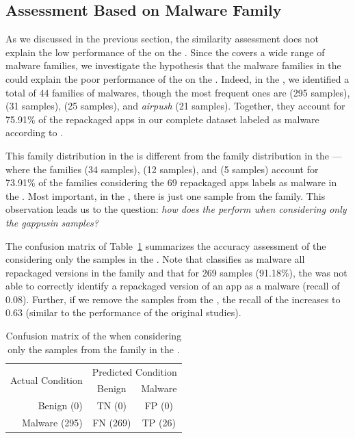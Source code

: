 \subsection{Assessment Based on Malware Family}


As we discussed in the previous
section, the similarity assessment does not explain the low performance of the
\mas on the \cds. Since the \cds covers a wide range of malware families, we investigate the
hypothesis that the malware families in the \cds could
explain the poor performance of the \mas on the \cds.
Indeed, in the \cds, we identified a total of
44 families of malwares, though the most frequent
ones are \gps (295 samples),  (31 samples),  (25 samples), and \emph{airpush} (21 samples). Together, they
account for 75.91\% of the repackaged apps in our
complete dataset labeled as malware according to \vt.

This family distribution in the \cds is
different from the family
distribution in the \sds---where the
families  (34 samples),  (12 samples),
and  (5 samples) account for
73.91\% of the families considering the 69
repackaged apps \vt labels as malware in the \sds.
Most important, in the \sds, there is just one
sample from the \gps family. This observation
leads us to the question: \emph{how does the \mas
perform when considering only the gappusin samples?}



The confusion matrix of Table~\ref{tab:gappusin} summarizes the accuracy assessment of the \mas considering
only the \gps samples in the \cds. Note that \vt classifies as malware all repackaged versions in the \gps
family and that for 269 samples (91.18\%), the \mas was not able to correctly identify
a repackaged version of an app as a malware (recall of 0.08). 
Further, if we remove the \gps
samples from the \cds, the recall
of the \mas increases to 0.63 (similar
to the performance of the original studies). 

\begin{table}[ht]
  \caption{Confusion matrix of the \mas when considering only the
  samples from the \gps family in the \cds.}
\centering
\begin{tabular}{r|cc} \hline
\multirow{2}{*}{Actual Condition}   & \multicolumn{2}{c}{Predicted Condition} \\ 
                                    & Benign    & Malware   \\ \hline 
  Benign  (0)                       & TN (0)    & FP (0)    \\
  Malware (295)                     & FN (269)  & TP (26)   \\ \hline
\end{tabular}
\label{tab:gappusin}
\end{table}


